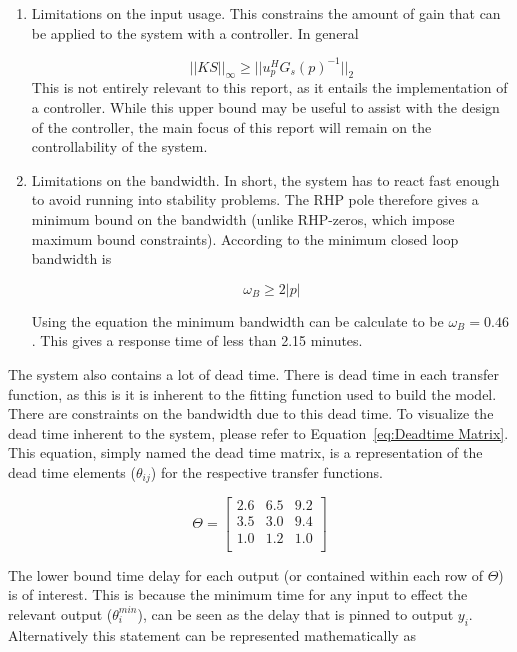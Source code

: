 \begin{enumerate}
	\item Limitations on the input usage. This constrains the amount of gain that can be applied to the system with a controller. In general
	
	\begin{equation}
		||KS||_{\infty} \geq ||u^H_p G_s(p)^{-1}||_2
	\end{equation}
	This is not entirely relevant to this report, as it entails the implementation of a controller. While this upper bound may be useful to assist with the design of the controller, the main focus of this report will remain on the controllability of the system.
	
	\item Limitations on the bandwidth. In short, the system has to react fast enough to avoid running into stability problems. The RHP pole therefore gives a minimum bound on the bandwidth (unlike RHP-zeros, which impose maximum bound constraints). According to \textcite{skogestad} the minimum closed loop bandwidth is 
	
	\begin{equation}
		\omega_B \geq 2|p|
	\end{equation}
	
	Using the equation the minimum bandwidth can be calculate to be $\omega_B = 0.46$. This gives a response time of less than 2.15 minutes.
\end{enumerate}

The system also contains a lot of dead time. There is dead time in each transfer function, as this is it is inherent to the fitting function used to build the model. There are constraints on the bandwidth due to this dead time. To visualize the dead time inherent to the system, please refer to Equation~\ref{eq:Deadtime Matrix}. This equation, simply named the dead time matrix, is a representation of the dead time elements ($\theta_{ij}$) for the respective transfer functions.

\begin{equation}
	\label{eq:Deadtime Matrix}
	\Theta = \begin{bmatrix}
	 2.6 & 6.5 & 9.2 \\
	 3.5 & 3.0 & 9.4 \\
	 1.0 & 1.2 & 1.0\\
	\end{bmatrix}
\end{equation} 

The lower bound time delay for each output (or contained within each row of $\Theta$) is of interest. This is because the minimum time for any input to effect the relevant output ($\theta_i^{min}$), can be seen as the delay that is pinned to output $y_i$. Alternatively this statement can be represented mathematically as 


